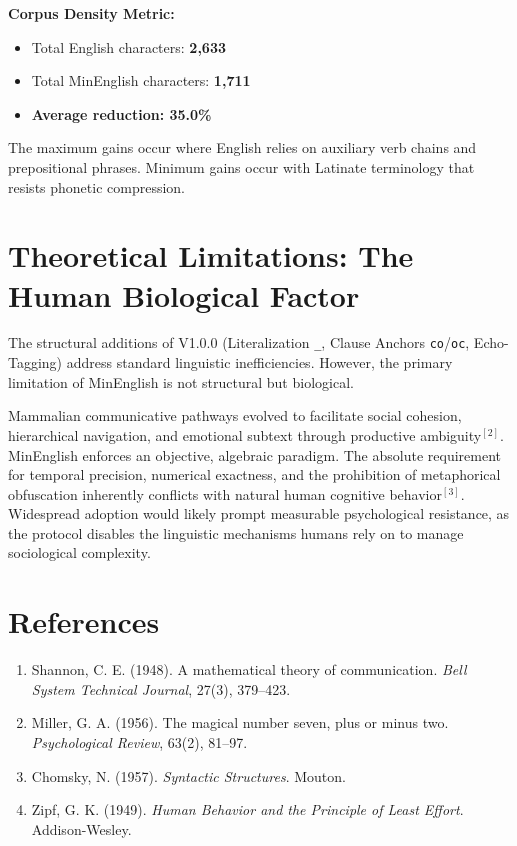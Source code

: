\documentclass[10pt,onecolumn,letterpaper]{article}
\newcommand{\me}[1]{\texttt{#1}}
\begin{document}
\textbf{Corpus Density Metric:}
\begin{itemize}[leftmargin=*,noitemsep]
    \item Total English characters: \textbf{2,633}
    \item Total MinEnglish characters: \textbf{1,711}
    \item \textbf{Average reduction: 35.0\%}
\end{itemize}

The maximum gains occur where English relies on auxiliary verb chains and
prepositional phrases. Minimum gains occur with Latinate terminology that
resists phonetic compression.

\section{Theoretical Limitations: The Human Biological Factor}

The structural additions of V1.0.0 (Literalization \me{\_}, Clause Anchors
\me{co}/\me{oc}, Echo-Tagging) address standard linguistic inefficiencies.
However, the primary limitation of MinEnglish is not structural but biological.

Mammalian communicative pathways evolved to facilitate social cohesion,
hierarchical navigation, and emotional subtext through productive
ambiguity$^{[2]}$. MinEnglish enforces an objective, algebraic paradigm.
The absolute requirement for temporal precision, numerical exactness, and
the prohibition of metaphorical obfuscation inherently conflicts with natural
human cognitive behavior$^{[3]}$. Widespread adoption would likely prompt
measurable psychological resistance, as the protocol disables the linguistic
mechanisms humans rely on to manage sociological complexity.

\section*{References}
\begin{enumerate}
\item Shannon, C. E. (1948). A mathematical theory of communication. \textit{Bell System Technical Journal}, 27(3), 379--423.
\item Miller, G. A. (1956). The magical number seven, plus or minus two. \textit{Psychological Review}, 63(2), 81--97.
\item Chomsky, N. (1957). \textit{Syntactic Structures}. Mouton.
\item Zipf, G. K. (1949). \textit{Human Behavior and the Principle of Least Effort}. Addison-Wesley.
\end{enumerate}
\end{document}
